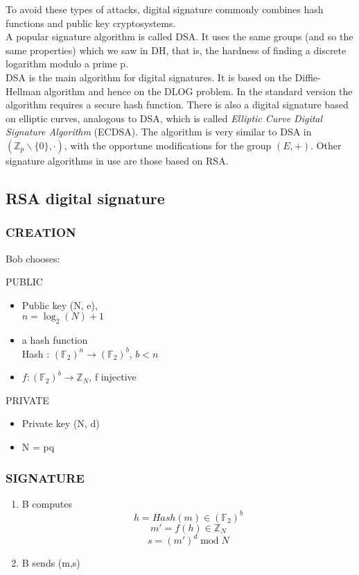 \documentclass[a4paper, 10pt, titlepage]{article}
\begin{document}
To avoid these types of attacks, digital signature commonly combines hash functions and public key cryptosystems. \medskip \\
A popular signature algorithm is called DSA. It uses the same groups (and so the same properties) which we saw in DH, that is, the hardness of finding a discrete logarithm modulo a prime p. \\
DSA is the main algorithm for digital signatures. It is based on the Diffie-Hellman algorithm and hence on the DLOG problem. In the standard version the algorithm requires a secure hash function.
There is also a digital signature based on elliptic curves, analogous to DSA, which is called \textit{Elliptic Curve Digital Signature Algorithm} (ECDSA).
The algorithm is very similar to DSA in $(\mathbb{Z}_p \backslash \{0\}, \cdot)$, with the opportune modifications for the group $(E, +)$.
Other signature algorithms in use are those based on RSA.

\subsection{RSA digital signature}
\subsubsection*{CREATION}
Bob chooses:
\begin{center}
PUBLIC
\end{center}
\begin{itemize}
\item Public key (N, e), \\$n = \log_2 (N) + 1$
\item a hash function \\Hash : $(\mathbb{F}_2)^n \rightarrow (\mathbb{F}_2)^b$, $b < n$
\item $f : (\mathbb{F}_2)^b \rightarrow \mathbb{Z}_N$, f injective
\end{itemize}
\begin{center}
PRIVATE
\end{center}
\begin{itemize}
\item Private key (N, d)
\item N = pq
\end{itemize}
\subsubsection*{SIGNATURE}
\begin{enumerate}
\item B computes
$$h = Hash(m) \in (\mathbb{F}_2)^b$$
$$m' = f(h) \in \mathbb{Z}_N$$
$$s = (m')^d \; \text{mod} \; N$$
\item B sends (m,s)
\end{enumerate}
\end{document}
